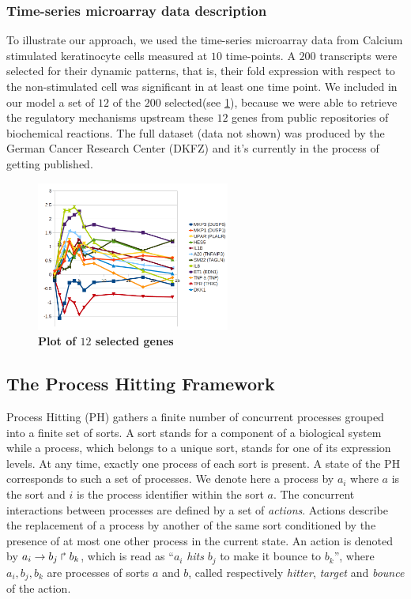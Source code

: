 \subsubsection{Time-series microarray data description}
\label{SECTSD}
To illustrate our approach, we used the time-series microarray data from Calcium stimulated keratinocyte cells 
 measured at $10$ time-points. A $200$ transcripts were selected for their dynamic patterns,
that is, their fold expression with respect to the non-stimulated cell was significant in at least one time point. 
We included in our model a set of $12$ of the $200$ selected(see \ref{tsd}), because we were able to retrieve the regulatory mechanisms upstream
these $12$ genes from public repositories of biochemical reactions.
The full dataset (data not shown) was produced by the German Cancer Research Center (DKFZ) and it's currently in the process
of getting published.  

\begin{figure}[!t]
\centering
\includegraphics[width=2.5in]{images/12genes.png}
\caption{\bf Plot of $12$ selected genes}
\label{tsd}
\end{figure}


\subsection{The Process  Hitting Framework}
\label{ssec:PH}



Process Hitting (PH) gathers a finite number of concurrent processes grouped into a finite set of sorts.
A sort stands for a component of a biological system while a process, which belongs to a unique sort, stands
for one of its expression levels. At any time, exactly one process of each sort is present. A state of the 
PH corresponds to such a set of processes. We denote here a process by $a_i$ where $a$ 
is the sort and $i$ is the process identifier within the sort $a$.
The concurrent interactions between processes are defined by a set of \emph{actions}.
Actions describe the replacement of a process by another of the same sort conditioned by the presence 
of at most one other process in the current state. An action is denoted by $a_i\rightarrow b_j\Rsh b_k$, 
which is read as ``$a_i$ \emph{hits} $b_j$ to make it bounce to $b_k$'', where $a_i,b_j,b_k$ are 
processes of sorts $a$ and $b$, called respectively \emph{hitter}, \emph{target} and \emph{bounce} of 
the action.

